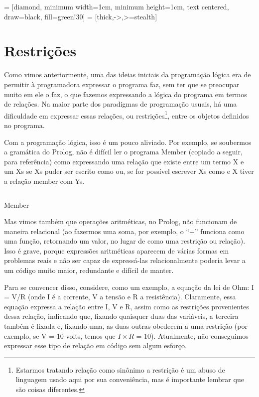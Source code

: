 
%

\usetikzlibrary{shapes.geometric, arrows}  =
               [diamond, minimum width=1cm, minimum height=1cm, text
                 centered, draw=black, fill=green!30]
                = [thick,->,>=stealth]

%
\section{Restrições}

Como vimos anteriormente, uma das ideias iniciais da programação
lógica era de permitir à programadora expressar  o
programa faz, sem ter que se preocupar muito em  ele o
faz, o que fazemos expressando a lógica do programa em termos de
relações. Na maior parte dos paradigmas de programação usuais, há uma
dificuldade em expressar essas relações, ou
restrições\footnote{Estarmos tratando relação como sinônimo a
  restrição é um abuso de linguagem usado aqui por sua conveniência,
  mas é importante lembrar que são coisas diferentes.}, entre os
objetos definidos no programa.

Com a programação lógica, isso é um pouco aliviado. Por exemplo, se
soubermos a gramática do Prolog, não é difícil ler o programa Member
(copiado a seguir, para referência) como expressando uma relação que
existe entre um termo X e um Xs se Xs puder ser escrito como
\codigo{[X|Xs]} ou, se for possível escrever Xs como \codigo{[Y|Ys]} e
X tiver a relação member com Ys.

\begin{listing}
  \inputminted{prolog}{../Exemplos/Cap4/prog1_member.pl}
  \caption{Member}
\end{listing}

Mas vimos também que operações aritméticas, no Prolog, não funcionam
de maneira relacional (ao fazermos uma soma, por exemplo, o ``+''
funciona como uma função, retornando um valor, no lugar de como uma
restrição ou relação). Isso é grave, porque expressões aritméticas
aparecem de várias formas em problemas reais e não ser capaz de
expressá-las relacionalmente poderia levar a um código muito maior,
redundante e difícil de manter.

Para se convencer disso, considere, como um exemplo, a equação da lei
de Ohm: I = V/R (onde I é a corrente, V a tensão e R a resistência).
Claramente, essa equação expressa a relação entre I, V e R, assim como
as restrições provenientes dessa relação, indicando que, fixando
quaisquer duas das variáveis, a terceira também é fixada e, fixando
uma, as duas outras obedecem a uma restrição (por exemplo, se V = 10
volts, temos que $I \times R$ = 10). Atualmente, não conseguimos
expressar esse tipo de relação em código sem algum esforço.

